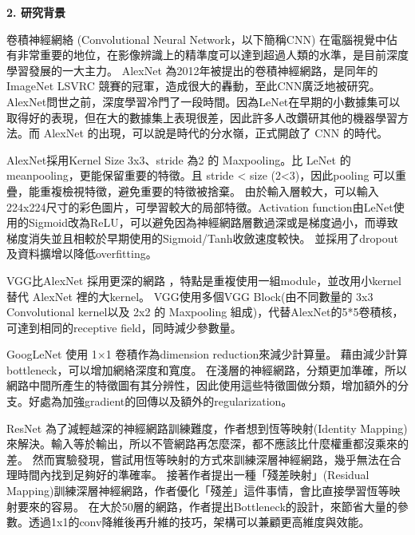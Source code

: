 \begin{flushleft}
  \setlength{\parskip}{10pt}
  
  {\fontsize{12}{0} \bf 2. 研究背景}

  \hspace*{2em}卷積神經網絡 (Convolutional Neural Network，以下簡稱CNN) 在電腦視覺中佔有非常重要的地位，在影像辨識上的精準度可以達到超過人類的水準，是目前深度學習發展的一大主力。
  AlexNet \cite{AlexNet} 為2012年被提出的卷積神經網路，是同年的ImageNet LSVRC 競賽的冠軍，造成很大的轟動，至此CNN廣泛地被研究。AlexNet問世之前，深度學習冷門了一段時間。因為LeNet在早期的小數據集可以取得好的表現，但在大的數據集上表現很差，因此許多人改鑽研其他的機器學習方法。而 AlexNet 的出現，可以說是時代的分水嶺，正式開啟了 CNN 的時代。
  
  \hspace*{2em}AlexNet\cite{AlexNet}採用Kernel Size 3x3、stride 為2 的 Maxpooling。比 LeNet 的meanpooling，更能保留重要的特徵。且 stride < size (2<3)，因此pooling 可以重疊，能重複檢視特徵，避免重要的特徵被捨棄。
  由於輸入層較大，可以輸入224x224尺寸的彩色圖片，可學習較大的局部特徵。Activation function由LeNet使用的Sigmoid改為ReLU，可以避免因為神經網路層數過深或是梯度過小，而導致梯度消失並且相較於早期使用的Sigmoid/Tanh收斂速度較快。
  並採用了dropout及資料擴增以降低overfitting。
  
  \hspace*{2em}VGG\cite{vgg}比AlexNet 採用更深的網路 ，特點是重複使用一組module，並改用小kernel替代 AlexNet 裡的大kernel。
  VGG使用多個VGG Block(由不同數量的 3x3 Convolutional kernel以及 2x2 的 Maxpooling 組成)，代替AlexNet的5*5卷積核，可達到相同的receptive field，同時減少參數量。

  \hspace{2em}GoogLeNet \cite{GoogLeNet}使用 1×1 卷積作為dimension reduction來減少計算量。 藉由減少計算bottleneck，可以增加網絡深度和寬度。
  在淺層的神經網路，分類更加準確，所以網路中間所產生的特徵圖有其分辨性，因此使用這些特徵圖做分類，增加額外的分支。好處為加強gradient的回傳以及額外的regularization。
  
  \hspace{2em}ResNet \cite{ResNet}為了減輕越深的神經網路訓練難度，作者想到恆等映射(Identity Mapping)來解決。輸入等於輸出，所以不管網路再怎麼深，都不應該比什麼權重都沒乘來的差。
  然而實驗發現，嘗試用恆等映射的方式來訓練深層神經網路，幾乎無法在合理時間內找到足夠好的準確率。
  接著作者提出一種「殘差映射」(Residual Mapping)訓練深層神經網路，作者優化「殘差」這件事情，會比直接學習恆等映射要來的容易。
  在大於50層的網路，作者提出Bottleneck的設計，來節省大量的參數。透過1x1的conv降維後再升維的技巧，架構可以兼顧更高維度與效能。
  

\end{flushleft}
